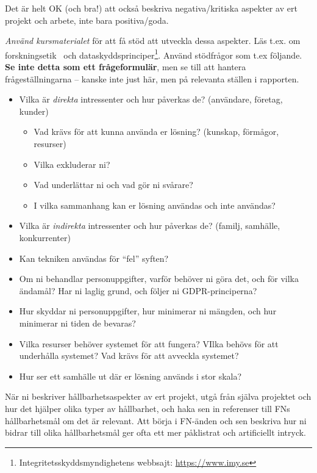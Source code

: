 Det är helt OK (och bra!) att också beskriva negativa/kritiska aspekter av ert projekt och arbete, inte bara positiva/goda. 

\emph{Använd kursmaterialet} för att få stöd att utveckla dessa aspekter. Läs t.ex. om forskningsetik~\cite{vr:forskningsetik} och dataskyddsprinciper\footnote{Integritetsskyddsmyndighetens webbsajt: \url{https://www.imy.se}}.
Använd stödfrågor som t.ex följande. \textbf{Se inte detta som ett frågeformulär}, men se till att hantera frågeställningarna -- kanske inte just här, men på relevanta ställen i rapporten.
\begin{itemize}
\item Vilka är \emph{direkta} intressenter och hur påverkas de? (användare, företag, kunder)
\begin{itemize}
\item  Vad krävs för att kunna använda er lösning? (kunskap, förmågor, resurser)
\item  Vilka exkluderar ni?
\item  Vad underlättar ni och vad gör ni svårare?
\item  I vilka sammanhang kan er lösning användas och inte användas?
\end{itemize}
\item  Vilka är \emph{indirekta} intressenter och hur påverkas de? (familj, samhälle, konkurrenter)
\item  Kan tekniken användas för ``fel'' syften?
\item Om ni behandlar personuppgifter, varför behöver ni göra det, och för vilka ändamål? Har ni laglig grund, och följer ni GDPR-principerna?
\item Hur skyddar ni personuppgifter, hur minimerar ni mängden, och hur minimerar ni tiden de bevaras?
\item Vilka resurser behöver systemet för att fungera? VIlka behövs för att underhålla systemet? Vad krävs för att avveckla systemet?
\item  Hur ser ett samhälle ut där er lösning används i stor skala?
\end{itemize}

När ni beskriver hållbarhetsaspekter av ert projekt, utgå från själva projektet och hur det hjälper olika typer av hållbarhet, och haka sen in referenser till FNs hållbarhetsmål om det är relevant. Att börja i FN-änden och sen beskriva hur ni bidrar till olika hållbarhetsmål ger ofta ett mer påklistrat och artificiellt intryck.


